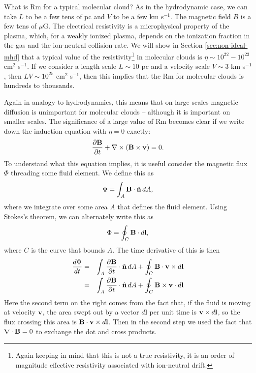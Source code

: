 What is Rm for a typical molecular cloud? As in the hydrodynamic case, we can take $L$ to be a few tens of pc and $V$ to be a few km s$^{-1}$. The magnetic field $B$ is a few tens of $\mu$G. The electrical resistivity is a microphysical property of the plasma, which, for a weakly ionized plasma, depends on the ionization fraction in the gas and the ion-neutral collision rate. We will show in Section \ref{sec:non-ideal-mhd} that a typical value of the resistivity\footnote{Again keeping in mind that this is not a true resistivity, it is an order of magnitude effective resistivity associated with ion-neutral drift.} in molecular clouds is $\eta\sim 10^{22}-10^{23}$ cm$^2$ s$^{-1}$. If we consider a length scale $L\sim 10$ pc and a velocity scale $V\sim 3$ km s$^{-1}$, then $LV\sim 10^{25}$ cm$^2$ s$^{-1}$, then this implies that the Rm for molecular clouds is hundreds to thousands.

Again in analogy to hydrodynamics, this means that on large scales magnetic diffusion is unimportant for molecular clouds -- although it is important on smaller scales. The significance of a large value of Rm becomes clear if we write down the induction equation with $\eta=0$ exactly:
\begin{equation}
\frac{\partial \mathbf{B}}{\partial t} + \nabla \times (\mathbf{B} \times \mathbf{v}) = 0.
\end{equation}
To understand what this equation implies, it is useful consider the magnetic flux $\Phi$ threading some fluid element. We define this as
\begin{equation}
\Phi = \int_A  \mathbf{B} \cdot \hat{\mathbf{n}}\, dA,
\end{equation}
where we integrate over some area $A$ that defines the fluid element. Using Stokes's theorem, we can alternately write this as
\begin{equation}
\Phi = \oint_C \mathbf{B} \cdot d\mathbf{l},
\end{equation}
where $C$ is the curve that bounds $A$. The time derivative of this is then
\begin{eqnarray}
\frac{d\Phi}{dt} & = & \int_A \frac{\partial\mathbf{B}}{\partial t}\cdot\hat{\mathbf{n}}\, dA + \oint_C \mathbf{B}\cdot \mathbf{v} \times d\mathbf{l} \\
& = & \int_A \frac{\partial\mathbf{B}}{\partial t}\cdot\hat{\mathbf{n}}\, dA + \oint_C \mathbf{B}\times \mathbf{v} \cdot d\mathbf{l}
\end{eqnarray}
Here the second term on the right comes from the fact that, if the fluid is moving at velocity $\mathbf{v}$, the area swept out by a vector $d\mathbf{l}$ per unit time is $\mathbf{v}\times d\mathbf{l}$, so the flux crossing this area is $\mathbf{B}\cdot \mathbf{v}\times d\mathbf{l}$. Then in the second step we used the fact that $\nabla\cdot \mathbf{B} = 0$ to exchange the dot and cross products.

